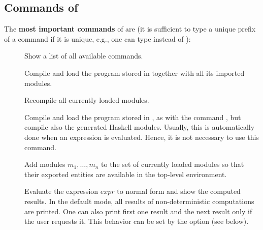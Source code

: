 \subsection{Commands of \CYS}
\label{sec:kics2-commands}

The {\bf most important commands} of \CYS are
(it is sufficient to type a unique prefix of a command if it is unique,
e.g., one can type  instead of ):

\begin{description}
\item[]
Show a list of all available commands.

\item[]
Compile and load the program stored in 
together with all its imported modules.

\item[]
Recompile all currently loaded modules.

\item[]
Compile and load the program stored in ,
as with the command ,
but compile also the generated Haskell modules.
Usually, this is automatically done when an expression is evaluated.
Hence, it is not necessary to use this command.

\item[]
Add modules $m_1,\ldots,m_n$ to the set of currently loaded modules
so that their exported entities are available in the top-level environment.

\item[] Evaluate the expression $expr$ to normal form
and show the computed results.
In the default mode, all results of
non-deterministic computations are printed.
One can also print first one result and the next result
only if the user requests it. This behavior can be set by
the option  (see below).


\end{description}
